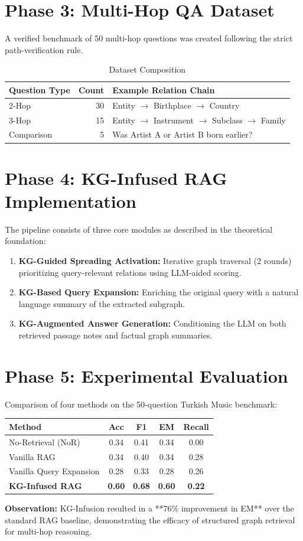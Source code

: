 \documentclass{report}
\begin{document}
\chapter{Phase 3: Multi-Hop QA Dataset}
A verified benchmark of 50 multi-hop questions was created following the strict path-verification rule.
\begin{table}[h!]
\centering
\caption{Dataset Composition}
\begin{tabular}{lrl}
\toprule
\textbf{Question Type} & \textbf{Count} & \textbf{Example Relation Chain} \\ \midrule
2-Hop & 30 & Entity $\to$ Birthplace $\to$ Country \\
3-Hop & 15 & Entity $\to$ Instrument $\to$ Subclass $\to$ Family \\
Comparison & 5 & Was Artist A or Artist B born earlier? \\ \bottomrule
\end{tabular}
\end{table}

\chapter{Phase 4: KG-Infused RAG Implementation}
The pipeline consists of three core modules as described in the theoretical foundation:
\begin{enumerate}
    \item \textbf{KG-Guided Spreading Activation:} Iterative graph traversal (2 rounds) prioritizing query-relevant relations using LLM-aided scoring.
    \item \textbf{KG-Based Query Expansion:} Enriching the original query with a natural language summary of the extracted subgraph.
    \item \textbf{KG-Augmented Answer Generation:} Conditioning the LLM on both retrieved passage notes and factual graph summaries.
\end{enumerate}

\chapter{Phase 5: Experimental Evaluation}
Comparison of four methods on the 50-question Turkish Music benchmark:
\begin{table}[h!]
\centering
\begin{tabular}{lcccc}
\toprule
\textbf{Method} & \textbf{Acc} & \textbf{F1} & \textbf{EM} & \textbf{Recall} \\ \midrule
No-Retrieval (NoR) & 0.34 & 0.41 & 0.34 & 0.00 \\
Vanilla RAG & 0.34 & 0.40 & 0.34 & 0.28 \\
Vanilla Query Expansion & 0.28 & 0.33 & 0.28 & 0.26 \\
\textbf{KG-Infused RAG} & \textbf{0.60} & \textbf{0.68} & \textbf{0.60} & \textbf{0.22} \\ \bottomrule
\end{tabular}
\end{table}
\textbf{Observation:} KG-Infusion resulted in a **76\% improvement in EM** over the standard RAG baseline, demonstrating the efficacy of structured graph retrieval for multi-hop reasoning.
\end{document}
